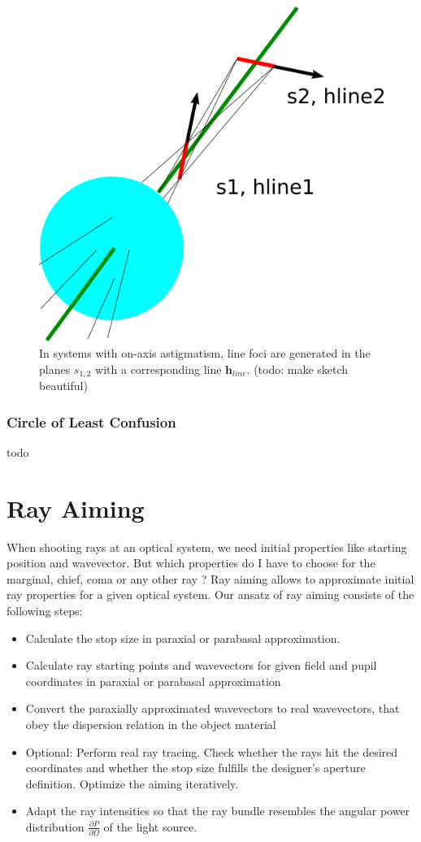 \documentclass[12pt,a4paper,twoside,openright,BCOR10mm,headsepline,titlepage,abstracton,chapterprefix,final]{scrreprt}
\newcommand\Vector[1]{{\mathbf{#1}}}
\begin{document}
\begin{figure}
  \centering
   \includegraphics[width=0.5\columnwidth]{xyuv_on_axis_astigmatism}
  \caption{
           In systems with on-axis astigmatism, line foci are generated in the planes $s_{1,2}$ with a corresponding line $\Vector{h}_{line}.$
           (todo: make sketch beautiful)
          }
  \label{fig:xyuv_on_axis_astigmatism}
\end{figure}

\subsubsection{Circle of Least Confusion}
todo

\section{Ray Aiming}
When shooting rays at an optical system, we need initial properties like starting position and wavevector.
But which properties do I have to choose for the marginal, chief, coma or any other ray ?
Ray aiming allows to approximate initial ray properties for a given optical system.
Our ansatz of ray aiming consists of the following steps:
\begin{itemize}
 \item Calculate the stop size in paraxial or parabasal approximation.
 \item Calculate ray starting points and wavevectors for given field and pupil coordinates in paraxial or parabasal approximation
 \item Convert the paraxially approximated wavevectors to real wavevectors,
       that obey the dispersion relation in the object material
 \item Optional: Perform real ray tracing. Check whether the rays hit the desired coordinates 
       and whether the stop size fulfills the designer's aperture definition.
       Optimize the aiming iteratively.
 \item Adapt the ray intensities so that the ray bundle resembles the angular power distribution $\frac{\partial P}{\partial \Omega}$ of the light source.
\end{itemize}
\end{document}
